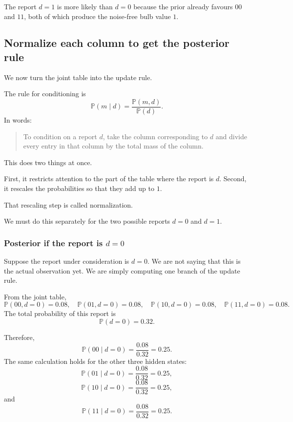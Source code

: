 \documentclass[11pt]{article}
\begin{document}
The report \(d=1\) is more likely than \(d=0\) because the prior already favours \(00\) and \(11\), both of which produce the noise-free bulb value \(1\).

\subsection{Normalize each column to get the posterior rule}

We now turn the joint table into the update rule.

The rule for conditioning is
\[
    \mathbb{P}(m\mid d)
    =
    \frac{\mathbb{P}(m,d)}{\mathbb{P}(d)}.
\]
In words:

\begin{quote}
    To condition on a report \(d\), take the column corresponding to \(d\) and divide every entry in that column by the total mass of the column.
\end{quote}

This does two things at once.

First, it restricts attention to the part of the table where the report is \(d\). Second, it rescales the probabilities so that they add up to \(1\).

That rescaling step is called normalization.

We must do this separately for the two possible reports \(d=0\) and \(d=1\).

\subsubsection{Posterior if the report is \(d=0\)}

Suppose the report under consideration is \(d=0\). We are not saying that this is the actual observation yet. We are simply computing one branch of the update rule.

From the joint table,
\[
    \mathbb{P}(00,d=0)=0.08,
    \quad
    \mathbb{P}(01,d=0)=0.08,
    \quad
    \mathbb{P}(10,d=0)=0.08,
    \quad
    \mathbb{P}(11,d=0)=0.08.
\]
The total probability of this report is
\[
    \mathbb{P}(d=0)=0.32.
\]

Therefore,
\[
    \mathbb{P}(00\mid d=0)
    =
    \frac{0.08}{0.32}
    =
    0.25.
\]
The same calculation holds for the other three hidden states:
\[
    \mathbb{P}(01\mid d=0)
    =
    \frac{0.08}{0.32}
    =
    0.25,
\]
\[
    \mathbb{P}(10\mid d=0)
    =
    \frac{0.08}{0.32}
    =
    0.25,
\]
and
\[
    \mathbb{P}(11\mid d=0)
    =
    \frac{0.08}{0.32}
    =
    0.25.
\]
\end{document}
